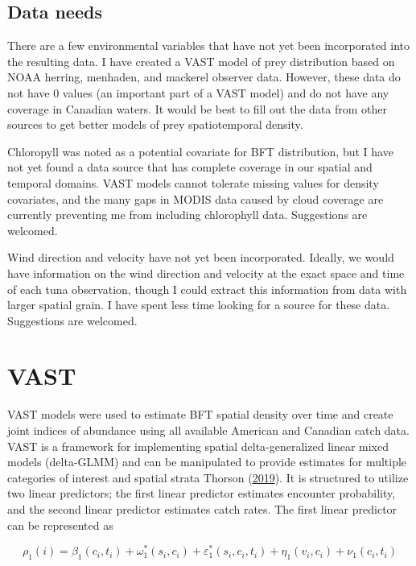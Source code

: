 \documentclass[
]{article}
\begin{document}
\hypertarget{data-needs}{%
\subsection{Data needs}\label{data-needs}}

There are a few environmental variables that have not yet been incorporated into the resulting data. I have created a VAST model of prey distribution based on NOAA herring, menhaden, and mackerel observer data. However, these data do not have 0 values (an important part of a VAST model) and do not have any coverage in Canadian waters. It would be best to fill out the data from other sources to get better models of prey spatiotemporal density.

Chloropyll was noted as a potential covariate for BFT distribution, but I have not yet found a data source that has complete coverage in our spatial and temporal domains. VAST models cannot tolerate missing values for density covariates, and the many gaps in MODIS data caused by cloud coverage are currently preventing me from including chlorophyll data. Suggestions are welcomed.

Wind direction and velocity have not yet been incorporated. Ideally, we would have information on the wind direction and velocity at the exact space and time of each tuna observation, though I could extract this information from data with larger spatial grain. I have spent less time looking for a source for these data. Suggestions are welcomed.

\hypertarget{vast}{%
\section{VAST}\label{vast}}

VAST models were used to estimate BFT spatial density over time and create joint indices of abundance using all available American and Canadian catch data. VAST is a framework for implementing spatial delta-generalized linear mixed models (delta-GLMM) and can be manipulated to provide estimates for multiple categories of interest and spatial strata Thorson (\protect\hyperlink{ref-thorson_2019}{2019}). It is structured to utilize two linear predictors; the first linear predictor estimates encounter probability, and the second linear predictor estimates catch rates. The first linear predictor can be represented as

\[\rho_1(i) = \beta_1(c_i, t_i) + \omega_1^*(s_i, c_i) + \varepsilon_1^*(s_i, c_i, t_i) + \eta_1(v_i, c_i) + \nu_1(c_i, t_i)\]
\end{document}
